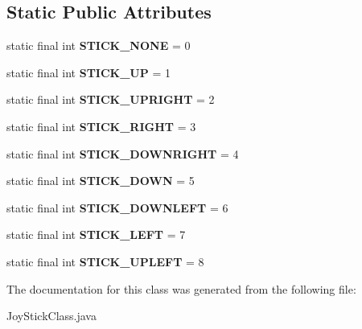 \subsection*{Static Public Attributes}
\begin{DoxyCompactItemize}
\item 
\hypertarget{classcom_1_1deltafountains_1_1JoyStickClass_a7754b0ec4eea08c1f6c976dc26e99b59}{static final int {\bfseries S\-T\-I\-C\-K\-\_\-\-N\-O\-N\-E} = 0}\label{classcom_1_1deltafountains_1_1JoyStickClass_a7754b0ec4eea08c1f6c976dc26e99b59}

\item 
\hypertarget{classcom_1_1deltafountains_1_1JoyStickClass_a7cdda747bf39f1a02f103d3abb418d42}{static final int {\bfseries S\-T\-I\-C\-K\-\_\-\-U\-P} = 1}\label{classcom_1_1deltafountains_1_1JoyStickClass_a7cdda747bf39f1a02f103d3abb418d42}

\item 
\hypertarget{classcom_1_1deltafountains_1_1JoyStickClass_a2bd33722100c50c2462830c83abec3c1}{static final int {\bfseries S\-T\-I\-C\-K\-\_\-\-U\-P\-R\-I\-G\-H\-T} = 2}\label{classcom_1_1deltafountains_1_1JoyStickClass_a2bd33722100c50c2462830c83abec3c1}

\item 
\hypertarget{classcom_1_1deltafountains_1_1JoyStickClass_a8952bbe3a7c01722cde45924bf3416d2}{static final int {\bfseries S\-T\-I\-C\-K\-\_\-\-R\-I\-G\-H\-T} = 3}\label{classcom_1_1deltafountains_1_1JoyStickClass_a8952bbe3a7c01722cde45924bf3416d2}

\item 
\hypertarget{classcom_1_1deltafountains_1_1JoyStickClass_a4d4b66fa1de0ee52aa5dcb31acd290eb}{static final int {\bfseries S\-T\-I\-C\-K\-\_\-\-D\-O\-W\-N\-R\-I\-G\-H\-T} = 4}\label{classcom_1_1deltafountains_1_1JoyStickClass_a4d4b66fa1de0ee52aa5dcb31acd290eb}

\item 
\hypertarget{classcom_1_1deltafountains_1_1JoyStickClass_a678b1466c665e03dbe8c7dbe07672dd4}{static final int {\bfseries S\-T\-I\-C\-K\-\_\-\-D\-O\-W\-N} = 5}\label{classcom_1_1deltafountains_1_1JoyStickClass_a678b1466c665e03dbe8c7dbe07672dd4}

\item 
\hypertarget{classcom_1_1deltafountains_1_1JoyStickClass_a45dd55e2e1d991c7b094e1fb37203d00}{static final int {\bfseries S\-T\-I\-C\-K\-\_\-\-D\-O\-W\-N\-L\-E\-F\-T} = 6}\label{classcom_1_1deltafountains_1_1JoyStickClass_a45dd55e2e1d991c7b094e1fb37203d00}

\item 
\hypertarget{classcom_1_1deltafountains_1_1JoyStickClass_afa3af1ec91521e7e9a7ac393a75d997e}{static final int {\bfseries S\-T\-I\-C\-K\-\_\-\-L\-E\-F\-T} = 7}\label{classcom_1_1deltafountains_1_1JoyStickClass_afa3af1ec91521e7e9a7ac393a75d997e}

\item 
\hypertarget{classcom_1_1deltafountains_1_1JoyStickClass_a365728f3e509df6e57857214b5131eaf}{static final int {\bfseries S\-T\-I\-C\-K\-\_\-\-U\-P\-L\-E\-F\-T} = 8}\label{classcom_1_1deltafountains_1_1JoyStickClass_a365728f3e509df6e57857214b5131eaf}

\end{DoxyCompactItemize}


The documentation for this class was generated from the following file\-:\begin{DoxyCompactItemize}
\item 
Joy\-Stick\-Class.\-java\end{DoxyCompactItemize}
